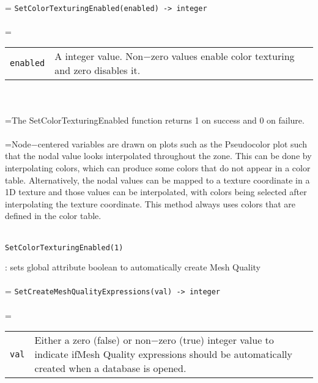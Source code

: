 \documentclass[10pt,a4paper]{report}
\begin{document}
 \\ 
\hangindent=\parindent 
\verb!SetColorTexturingEnabled(enabled) -> integer!\\ [-3mm]

 \\ 
\hangindent=\parindent 
\begin{tabular}{lp{9cm}}
\verb!enabled! & A integer value. Non$-$zero values enable color texturing and zero disables it. \\
\end{tabular} \\[-2mm]


 \\ 
\hangindent=\parindent The SetColorTexturingEnabled function returns 1 on success and 0 on failure. \\[-3mm] 

 \\ 
\hangindent=\parindent Node$-$centered variables are drawn on plots such as the Pseudocolor plot such that the nodal value looks interpolated throughout the zone. This can be done by interpolating colors, which can produce some colors that do not appear in a color table. Alternatively, the nodal values can be mapped to a texture coordinate in a 1D texture and those values can be interpolated, with colors being selected after interpolating the texture coordinate. This method always uses colors that are defined in the color table. \\[-3mm] 

\\[-6mm]
\begin{verbatim}SetColorTexturingEnabled(1)
\end{verbatim}
\newpage


{}
: sets global attribute boolean to automatically create Mesh Quality \\[-3mm]

 \\ 
\hangindent=\parindent 
\verb!SetCreateMeshQualityExpressions(val) -> integer!\\ [-3mm]

 \\ 
\hangindent=\parindent 
\begin{tabular}{lp{9cm}}
\verb!val! & Either a zero (false) or non$-$zero (true) integer value to indicate ifMesh Quality expressions should be automatically created when a database is opened. \\
\end{tabular} \\[-2mm]
\end{document}
